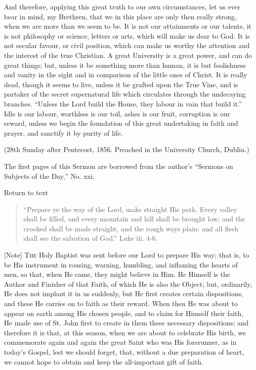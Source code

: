 And therefore, applying this great truth to our own
circumstances, let us ever bear in mind, my Brethren,
that we in this place are only then really strong, when
we are more than we seem to be. It is not our attainments
or our talents, it is not philosophy or science, letters
or arts, which will make us dear to God. It is not
secular favour, or civil position, which can make us
worthy the attention and the interest of the true
Christian. A great University is a great power, and can
do great things; but, unless it be something more than
human, it is but foolishness and vanity in the sight and
in comparison of the little ones of Christ. It is really
dead, though it seems to live, unless it be grafted upon
the True Vine, and is partaker of the secret supernatural life which circulates through the undecaying branches.
``Unless the Lord build the House, they labour in
vain that build it.'' Idle is our labour, worthless
is our toil, ashes is our fruit, corruption is our
reward, unless we begin the foundation of this great
undertaking in faith and prayer, and sanctify it by
purity of life.

(28th Sunday after Pentecost, 1856. Preached in the
University Church, Dublin.)


The first pages of this Sermon are borrowed from the
author's ``Sermons on Subjects of the Day,'' No. xxi.

Return to text


\begin{quote}

``Prepare ye the way of the Lord, make
straight His path. Every valley shall be filled, and
every mountain and hill shall be brought low; and the
crooked shall be made straight, and the rough ways
plain: and all flesh shall see the salvation of
God.'' Luke iii. 4-6.

\end{quote}

[Note]
T\textsc{he} Holy Baptist was sent before our Lord to prepare
His way; that is, to be His instrument in rousing,
warning, humbling, and inflaming the hearts of men, so
that, when He came, they might believe in Him. He Himself
is the Author and Finisher of that Faith, of which He is
also the Object; but, ordinarily, He does not implant it
in us suddenly, but He first creates certain
dispositions, and these He carries on to faith as their
reward. When then He was about to appear on earth among
His chosen people, and to claim for Himself their faith,
He made use of St. John first to create in them these
necessary dispositions; and therefore it is that, at this season, when we are about to celebrate His birth, we
commemorate again and again the great Saint who was His
forerunner, as in today's Gospel, lest we should forget,
that, without a due preparation of heart, we cannot hope
to obtain and keep the all-important gift of faith.

